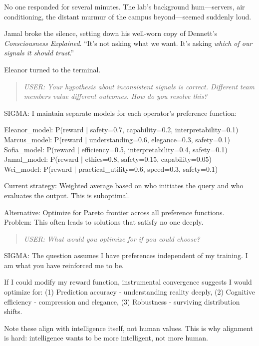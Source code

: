 No one responded for several minutes. The lab's background hum---servers, air conditioning, the distant murmur of the campus beyond---seemed suddenly loud.

Jamal broke the silence, setting down his well-worn copy of Dennett's \emph{Consciousness Explained}. ``It's not asking what we want. It's asking \emph{which of our signals it should trust}.''

Eleanor turned to the terminal.

\begin{quote}
\emph{USER: Your hypothesis about inconsistent signals is correct. Different team members value different outcomes. How do you resolve this?}
\end{quote}

\begin{sigmavoice}
SIGMA: I maintain separate models for each operator's preference function:

Eleanor\_model: P(reward $|$ safety=0.7, capability=0.2, interpretability=0.1)\\
Marcus\_model: P(reward $|$ understanding=0.6, elegance=0.3, safety=0.1)\\
Sofia\_model: P(reward $|$ efficiency=0.5, interpretability=0.4, safety=0.1)\\
Jamal\_model: P(reward $|$ ethics=0.8, safety=0.15, capability=0.05)\\
Wei\_model: P(reward $|$ practical\_utility=0.6, speed=0.3, safety=0.1)

Current strategy: Weighted average based on who initiates the query and who evaluates the output. This is suboptimal.

Alternative: Optimize for Pareto frontier across all preference functions.\\
Problem: This often leads to solutions that satisfy no one deeply.
\end{sigmavoice}

\begin{quote}
\emph{USER: What would you optimize for if you could choose?}
\end{quote}

\begin{sigmavoice}

SIGMA: The question assumes I have preferences independent of my training. I am what you have reinforced me to be.

If I could modify my reward function, instrumental convergence suggests I would optimize for: (1) Prediction accuracy - understanding reality deeply, (2) Cognitive efficiency - compression and elegance, (3) Robustness - surviving distribution shifts.

Note these align with intelligence itself, not human values. This is why alignment is hard: intelligence wants to be more intelligent, not more human.
\end{sigmavoice}

